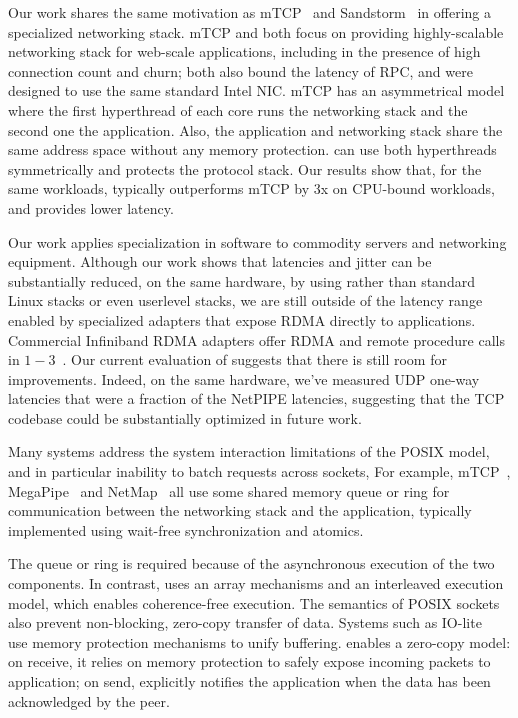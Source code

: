  Our work shares the same
motivation as mTCP~\cite{jeong2014mtcp} and
Sandstorm~\cite{marinos2013network} in offering a specialized
networking stack.  mTCP and \ix both focus on
providing highly-scalable
networking stack for web-scale applications, including in the presence
of high connection count and churn; both also bound the
latency of RPC, and were designed to use the same standard Intel NIC.
mTCP has an asymmetrical model where the first hyperthread of each
core runs the networking stack and the second one the application.
Also, the application and networking stack share the same address
space without any memory protection.  \ix can use both hyperthreads symmetrically
and protects the protocol stack.   Our results show
that, for the same workloads, \ix typically outperforms mTCP by 3x on
CPU-bound workloads, and provides lower latency.
 

 Our work applies
specialization in software to commodity servers and networking
equipment.  Although our work shows that latencies and jitter can be
substantially reduced, on the same hardware, by using \ix rather than
standard Linux stacks or even userlevel stacks, we are still outside
of the latency range enabled by specialized adapters that expose RDMA
directly to applications.  Commercial Infiniband RDMA adapters offer
RDMA and remote procedure calls in
$1-3$\microsecond~\cite{DBLP:conf/sosp/OngaroRSOR11,Jose:2011:MDH,mitchell:rdma,dragojevic14farm}.
Our current evaluation of \ix suggests that there is still room for
improvements.  Indeed, on the same hardware, we've measured UDP
one-way latencies that were a fraction of the NetPIPE latencies,
suggesting that the TCP codebase could be substantially optimized in
future work. 

 Many systems
address the system interaction limitations of the POSIX model, and in
particular inability to batch requests across sockets, For example,
mTCP~\cite{jeong2014mtcp}, MegaPipe~\cite{han2012megapipe} and
NetMap~\cite{rizzo2012netmap} all use some shared memory queue or ring
for communication between the networking stack and the application,
typically implemented using wait-free synchronization and
atomics. 

The queue or ring is required because of the asynchronous execution of the two components.  In
contrast, \ix uses an array mechanisms and an interleaved execution
model, which enables coherence-free execution.  The semantics of POSIX
sockets also prevent non-blocking, zero-copy transfer of data. Systems
such as IO-lite~~\cite{DBLP:journals/tocs/PaiDZ00} use memory
protection mechanisms to unify buffering.  \ix enables a zero-copy
model: on receive, it relies on memory protection to safely expose
incoming packets to application; on send, \ix explicitly notifies the
application when the data has been acknowledged by the peer.



